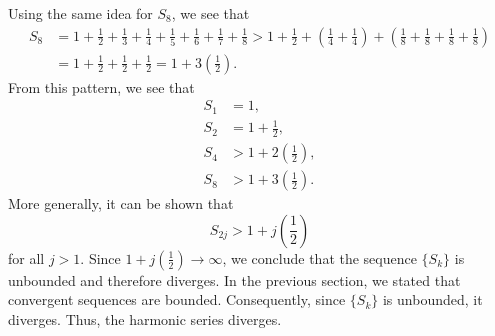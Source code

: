 \documentclass{report}
\begin{document}
    Using the same idea for \( S_8 \), we see that
    \begin{align*}
        S_8 &= 1 + \frac{1}{2} + \frac{1}{3} + \frac{1}{4} + \frac{1}{5} + \frac{1}{6} + \frac{1}{7} + \frac{1}{8} > 1 + \frac{1}{2} + \left( \frac{1}{4} + \frac{1}{4} \right) + \left( \frac{1}{8} + \frac{1}{8} + \frac{1}{8} + \frac{1}{8} \right) \\
       &= 1 + \frac{1}{2} + \frac{1}{2} + \frac{1}{2} = 1 + 3 \left( \frac{1}{2} \right)
    .\end{align*}
    \bigbreak \noindent 
    From this pattern, we see that 
    \begin{align*}
    S_1 & = 1, \\
    S_2 & = 1 + \frac{1}{2}, \\
    S_4 & > 1 + 2 \left( \frac{1}{2} \right), \\
    S_8 & > 1 + 3 \left( \frac{1}{2} \right).
    \end{align*}
    More generally, it can be shown that 
    \[ S_{2j} > 1 + j \left( \frac{1}{2} \right) \]
    for all \( j > 1 \). 
    Since \( 1 + j \left( \frac{1}{2} \right) \to \infty \), we conclude that the sequence \( \{ S_k \} \) is unbounded and therefore diverges. In the previous section, we stated that convergent sequences are bounded. Consequently, since \( \{ S_k \} \) is unbounded, it diverges. Thus, the harmonic series diverges.

    \pagebreak 
\end{document}

